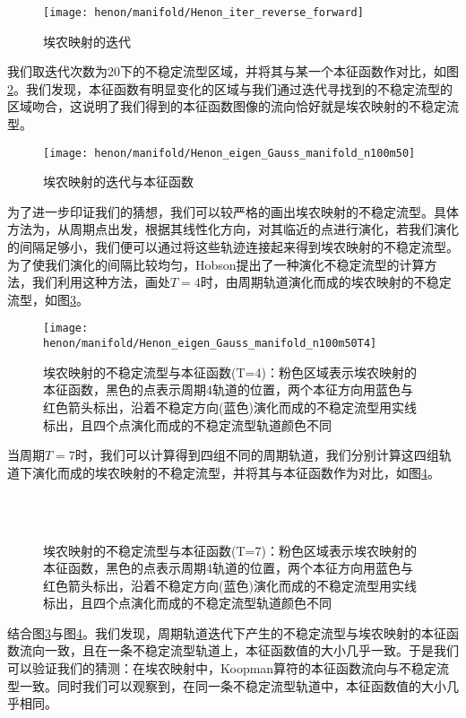 \begin{figure}
	\centering
	\texttt{[image: henon/manifold/Henon\_iter\_reverse\_forward]}
    \caption{埃农映射的迭代}\label{fig:Henon_iter_reverse_forward}
\end{figure}
我们取迭代次数为20下的不稳定流型区域，并将其与某一个本征函数作对比，如图\ref{fig:Henon_eigen_Gauss_manifold_n100m50}。我们发现，本征函数有明显变化的区域与我们通过迭代寻找到的不稳定流型的区域吻合，这说明了我们得到的本征函数图像的流向恰好就是埃农映射的不稳定流型。
\begin{figure}
	\centering
	\texttt{[image: henon/manifold/Henon\_eigen\_Gauss\_manifold\_n100m50]}
    \caption{埃农映射的迭代与本征函数}\label{fig:Henon_eigen_Gauss_manifold_n100m50}
\end{figure}
为了进一步印证我们的猜想，我们可以较严格的画出埃农映射的不稳定流型。具体方法为，从周期点出发，根据其线性化方向，对其临近的点进行演化，若我们演化的间隔足够小，我们便可以通过将这些轨迹连接起来得到埃农映射的不稳定流型。为了使我们演化的间隔比较均匀，Hobson提出了一种演化不稳定流型的计算方法，我们利用这种方法，画处$T=4$时，由周期轨道演化而成的埃农映射的不稳定流型，如图\ref{fig:Henon_eigen_Gauss_manifold_n100m50T4}。
\begin{figure}
	\centering
	\texttt{[image: henon/manifold/Henon\_eigen\_Gauss\_manifold\_n100m50T4]}
    \caption[埃农映射的不稳定流型与本征函数]{埃农映射的不稳定流型与本征函数(T=4)：粉色区域表示埃农映射的本征函数，黑色的点表示周期4轨道的位置，两个本征方向用蓝色与红色箭头标出，沿着不稳定方向(蓝色)演化而成的不稳定流型用实线标出，且四个点演化而成的不稳定流型轨道颜色不同}\label{fig:Henon_eigen_Gauss_manifold_n100m50T4}
\end{figure}
当周期$T=7$时，我们可以计算得到四组不同的周期轨道，我们分别计算这四组轨道下演化而成的埃农映射的不稳定流型，并将其与本征函数作为对比，如图\ref{fig:Henon_eigen_Gauss_manifold_n100m50T7_4}。
\begin{figure}
    \centering
    \\
    \\
    \caption[埃农映射的不稳定流型与本征函数]{埃农映射的不稳定流型与本征函数(T=7)：粉色区域表示埃农映射的本征函数，黑色的点表示周期4轨道的位置，两个本征方向用蓝色与红色箭头标出，沿着不稳定方向(蓝色)演化而成的不稳定流型用实线标出，且四个点演化而成的不稳定流型轨道颜色不同}\label{fig:Henon_eigen_Gauss_manifold_n100m50T7_4}
\end{figure}
结合图\ref{fig:Henon_eigen_Gauss_manifold_n100m50T4}与图\ref{fig:Henon_eigen_Gauss_manifold_n100m50T7_4}。我们发现，周期轨道迭代下产生的不稳定流型与埃农映射的本征函数流向一致，且在一条不稳定流型轨道上，本征函数值的大小几乎一致。于是我们可以验证我们的猜测：在埃农映射中，Koopman算符的本征函数流向与不稳定流型一致。同时我们可以观察到，在同一条不稳定流型轨道中，本征函数值的大小几乎相同。

